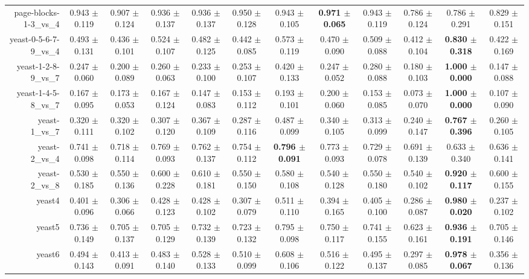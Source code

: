 \begin{table}[!ht]
{\begin{tabular}{r c c c c c c c c c c c}
page-blocks-1-3\_vs\_4 & 0.943 $\pm$ 0.119 & 0.907 $\pm$ 0.124 & 0.936 $\pm$ 0.137 & 0.936 $\pm$ 0.137 & 0.950 $\pm$ 0.128 & 0.943 $\pm$ 0.105 & \textbf{0.971 $\pm$ 0.065} & 0.943 $\pm$ 0.119 & 0.786 $\pm$ 0.124 & 0.786 $\pm$ 0.291 & 0.829 $\pm$ 0.151 \\
yeast-0-5-6-7-9\_vs\_4 & 0.493 $\pm$ 0.131 & 0.436 $\pm$ 0.101 & 0.524 $\pm$ 0.107 & 0.482 $\pm$ 0.125 & 0.442 $\pm$ 0.085 & 0.573 $\pm$ 0.119 & 0.470 $\pm$ 0.090 & 0.509 $\pm$ 0.088 & 0.412 $\pm$ 0.104 & \textbf{0.830 $\pm$ 0.318} & 0.422 $\pm$ 0.169 \\
yeast-1-2-8-9\_vs\_7 & 0.247 $\pm$ 0.060 & 0.200 $\pm$ 0.089 & 0.260 $\pm$ 0.063 & 0.233 $\pm$ 0.100 & 0.253 $\pm$ 0.107 & 0.420 $\pm$ 0.133 & 0.247 $\pm$ 0.052 & 0.280 $\pm$ 0.088 & 0.180 $\pm$ 0.103 & \textbf{1.000 $\pm$ 0.000} & 0.147 $\pm$ 0.088 \\
yeast-1-4-5-8\_vs\_7 & 0.167 $\pm$ 0.095 & 0.173 $\pm$ 0.053 & 0.167 $\pm$ 0.124 & 0.147 $\pm$ 0.083 & 0.153 $\pm$ 0.112 & 0.193 $\pm$ 0.101 & 0.200 $\pm$ 0.060 & 0.153 $\pm$ 0.085 & 0.073 $\pm$ 0.070 & \textbf{1.000 $\pm$ 0.000} & 0.107 $\pm$ 0.090 \\
yeast-1\_vs\_7 & 0.320 $\pm$ 0.111 & 0.320 $\pm$ 0.102 & 0.307 $\pm$ 0.120 & 0.367 $\pm$ 0.109 & 0.287 $\pm$ 0.116 & 0.487 $\pm$ 0.099 & 0.340 $\pm$ 0.105 & 0.313 $\pm$ 0.099 & 0.240 $\pm$ 0.147 & \textbf{0.767 $\pm$ 0.396} & 0.260 $\pm$ 0.105 \\
yeast-2\_vs\_4 & 0.741 $\pm$ 0.098 & 0.718 $\pm$ 0.114 & 0.769 $\pm$ 0.093 & 0.762 $\pm$ 0.137 & 0.754 $\pm$ 0.112 & \textbf{0.796 $\pm$ 0.091} & 0.773 $\pm$ 0.093 & 0.729 $\pm$ 0.078 & 0.691 $\pm$ 0.139 & 0.633 $\pm$ 0.340 & 0.636 $\pm$ 0.141 \\
yeast-2\_vs\_8 & 0.530 $\pm$ 0.185 & 0.550 $\pm$ 0.136 & 0.600 $\pm$ 0.228 & 0.610 $\pm$ 0.181 & 0.550 $\pm$ 0.150 & 0.580 $\pm$ 0.108 & 0.540 $\pm$ 0.128 & 0.550 $\pm$ 0.180 & 0.540 $\pm$ 0.102 & \textbf{0.920 $\pm$ 0.117} & 0.600 $\pm$ 0.155 \\
yeast4 & 0.401 $\pm$ 0.096 & 0.306 $\pm$ 0.066 & 0.428 $\pm$ 0.123 & 0.428 $\pm$ 0.102 & 0.307 $\pm$ 0.079 & 0.511 $\pm$ 0.110 & 0.394 $\pm$ 0.165 & 0.405 $\pm$ 0.100 & 0.286 $\pm$ 0.087 & \textbf{0.980 $\pm$ 0.020} & 0.237 $\pm$ 0.102 \\
yeast5 & 0.736 $\pm$ 0.149 & 0.705 $\pm$ 0.137 & 0.705 $\pm$ 0.129 & 0.732 $\pm$ 0.139 & 0.723 $\pm$ 0.132 & 0.795 $\pm$ 0.098 & 0.750 $\pm$ 0.117 & 0.741 $\pm$ 0.155 & 0.623 $\pm$ 0.161 & \textbf{0.936 $\pm$ 0.191} & 0.705 $\pm$ 0.146 \\
yeast6 & 0.494 $\pm$ 0.143 & 0.413 $\pm$ 0.091 & 0.483 $\pm$ 0.140 & 0.528 $\pm$ 0.133 & 0.510 $\pm$ 0.099 & 0.608 $\pm$ 0.106 & 0.516 $\pm$ 0.122 & 0.495 $\pm$ 0.137 & 0.297 $\pm$ 0.085 & \textbf{0.978 $\pm$ 0.067} & 0.356 $\pm$ 0.136 \\

\end{tabular}}
\end{table}
